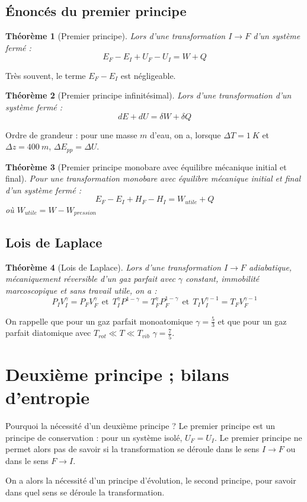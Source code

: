 \documentclass[french]{book}
\theoremstyle{plain}
\newtheorem{thm}{Théorème}
\theoremstyle{definition}
\theoremstyle{remark}
\begin{document}
\subsection{Énoncés du premier principe}
\begin{thm}[Premier principe]
	Lors d'une transformation $I\to F$ d'un système fermé : $$E_F-E_I+U_F-U_I=W+Q$$ 
\end{thm}Très souvent, le terme $E_F-E_I$ est négligeable. \\ \par \begin{thm}[Premier principe infinitésimal]
	Lors d'une transformation d'un système fermé : $$dE+dU=\delta W+\delta Q$$
\end{thm} \par Ordre de grandeur : pour une masse $m$ d'eau, on a, lorsque $\Delta T=1\ K$ et $\Delta z=400\ m$, $\Delta E_{pp}=\Delta U$.
\begin{thm}[Premier principe monobare avec équilibre mécanique initial et final]
	Pour une transformation monobare avec équilibre mécanique initial et final d'un système fermé : $$E_F-E_I+H_F-H_I=W_{utile}+Q$$ où $W_{utile}=W-W_{pression}$
\end{thm}
\subsection{Lois de Laplace}
\begin{thm}[Lois de Laplace]
	Lors d'une transformation $I\to F$ adiabatique, mécaniquement réversible d'un gaz parfait avec $\gamma$ constant, immobilité marcoscopique et sans travail utile, on a : $$ P_IV_I^\gamma=P_FV_F^\gamma \ \ \text{et} \ \ T_I^\gamma P^{1-\gamma}=T_F^\gamma P_F^{1-\gamma} \ \ \text{et} \ \ T_IV_I^{\gamma-1}=T_FV_F^{\gamma-1}$$
\end{thm}
On rappelle que pour un gaz parfait monoatomique $\gamma=\displaystyle\frac53$ et que pour un gaz parfait diatomique avec $T_{rot}\ll T\ll T_{vib}$ $\gamma=\displaystyle\frac75$.
\section{Deuxième principe ; bilans d'entropie}
Pourquoi la nécessité d'un deuxième principe ? Le premier principe est un principe de conservation : pour un système isolé, $U_F=U_I$. Le premier principe ne permet alors pas de savoir si la transformation se déroule dans le sens $I\to F$ ou dans le sens $F\to I$. \\ \par On a alors la nécessité d'un principe d'évolution, le second principe, pour savoir dans quel sens se déroule la transformation.
\end{document}
